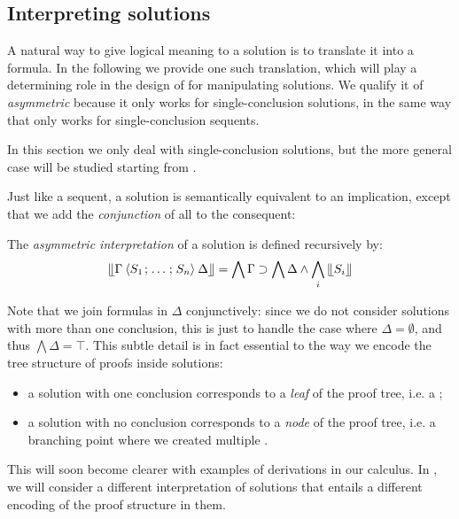 \begin{scope}
\subsection{Interpreting solutions}

A natural way to give logical meaning to a solution is to translate it into a
formula. In the following we provide one such translation, which will play a
determining role in the design of  for manipulating solutions. We
qualify it of \emph{asymmetric} because it only works for single-conclusion
solutions, in the same way that  only works for single-conclusion
sequents.

\begin{remark}
In this section we only deal with single-conclusion solutions, but the more
general case will be studied starting from .
\end{remark}

Just like a sequent, a solution is semantically equivalent to an implication,
except that we add the \emph{conjunction} of all  to the consequent:

\begin{definition}
The \emph{asymmetric interpretation} of a solution is defined recursively by:
$$\llfloor \Gamma \mathbin{\langle S_1 \;\!;\!\; \ldots \;\!;\!\; S_n \rangle} \Delta \rrfloor = \bigwedge \Gamma
  \supset \bigwedge \Delta \land \bigwedge_i{\llfloor S_i \rrfloor}$$
\end{definition}

Note that we join formulas in $\Delta$ conjunctively: since we do not consider
solutions with more than one conclusion, this is just to handle the case where
$\Delta = \emptyset$, and thus $\bigwedge \Delta = \top$. This subtle detail is
in fact essential to the way we encode the tree structure of proofs inside
solutions:
\begin{itemize}
\item a solution with one conclusion corresponds to a \emph{leaf} of the proof
tree, i.e. a ;
\item a solution with no conclusion corresponds to a \emph{node} of the proof
tree, i.e. a branching point where we created multiple .
\end{itemize}
This will soon become clearer with examples of derivations in our calculus. In
, we will consider a different interpretation of solutions that
entails a different encoding of the proof structure in them.


\end{scope}
